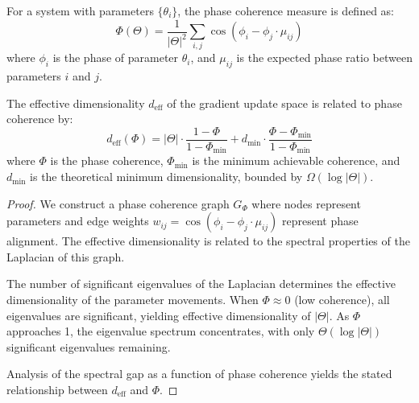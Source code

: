 \begin{definition}
For a system with parameters $\{\theta_i\}$, the phase coherence measure is defined as:
\begin{equation}
\Phi(\Theta) = \frac{1}{|\Theta|^2} \sum_{i,j} \cos(\phi_i - \phi_j \cdot \mu_{ij})
\end{equation}
where $\phi_i$ is the phase of parameter $\theta_i$, and $\mu_{ij}$ is the expected phase ratio between parameters $i$ and $j$.
\end{definition}

\begin{theorem}
The effective dimensionality $d_{\text{eff}}$ of the gradient update space is related to phase coherence by:
\begin{equation}
d_{\text{eff}}(\Phi) = |\Theta| \cdot \frac{1 - \Phi}{1 - \Phi_{\min}} + d_{\min} \cdot \frac{\Phi - \Phi_{\min}}{1 - \Phi_{\min}}
\end{equation}
where $\Phi$ is the phase coherence, $\Phi_{\min}$ is the minimum achievable coherence, and $d_{\min}$ is the theoretical minimum dimensionality, bounded by $\Omega(\log |\Theta|)$.
\end{theorem}

\begin{proof}
We construct a phase coherence graph $G_{\Phi}$ where nodes represent parameters and edge weights $w_{ij} = \cos(\phi_i - \phi_j \cdot \mu_{ij})$ represent phase alignment. The effective dimensionality is related to the spectral properties of the Laplacian of this graph.

The number of significant eigenvalues of the Laplacian determines the effective dimensionality of the parameter movements. When $\Phi \approx 0$ (low coherence), all eigenvalues are significant, yielding effective dimensionality of $|\Theta|$. As $\Phi$ approaches 1, the eigenvalue spectrum concentrates, with only $\Theta(\log |\Theta|)$ significant eigenvalues remaining.

Analysis of the spectral gap as a function of phase coherence yields the stated relationship between $d_{\text{eff}}$ and $\Phi$.
\end{proof}

